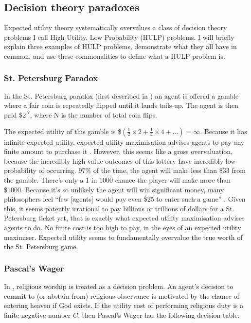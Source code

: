 \documentclass{article}
\begin{document}
\subsection {Decision theory paradoxes}

Expected utility theory systematically overvalues a class of decision theory problems I call High Utility, Low Probability (HULP) problems. I will briefly explain three examples of HULP problems, demonstrate what they all have in common, and use these commonalities to define what a HULP problem is.

\subsubsection {St. Petersburg Paradox}

In the St. Petersburg paradox (first described in \citet{bernoulli1954exposition}) an agent is offered a gamble where a fair coin is repeatedly flipped until it lands tails-up. The agent is then paid \$\(2^N\), where N is the number of total coin flips.

The expected utility of this gamble is \$\((\frac{1}{2}\times2 + \frac{1}{4}\times4+...) = \infty\). Because it has infinite expected utility, expected utility maximisation advises agents to pay any finite amount to purchase it \citep{resnik1987choices}. However, this seems like a gross overvaluation, because the incredibly high-value outcomes of this lottery have incredibly low probability of occurring. 97\% of the time, the agent will make less than \$33 from the gamble. There's only a 1 in 1000 chance the player will make more than \$1000. Because it's so unlikely the agent will win significant money, many philosophers feel ``few [agents] would pay even \$25 to enter such a game'' \citep{hacking1980strange}. Given this, it seems patently irrational to pay billions or trillions of dollars for a St. Petersburg ticket \textemdash{} yet, that is exactly what expected utility maximisation advises agents to do. No finite cost is too high to pay, in the eyes of an expected utility maximiser. Expected utility seems to fundamentally overvalue the true worth of the St. Petersburg game.

\subsubsection {Pascal's Wager}

In \citet{pascal1852pensees}, religious worship is treated as a decision problem. An agent's decision to commit to (or abstain from) religious observance is motivated by the chance of entering heaven if God exists. If the utility cost of performing religious duty is a finite negative number \(C\), then Pascal's Wager has the following decision table:
\end{document}
